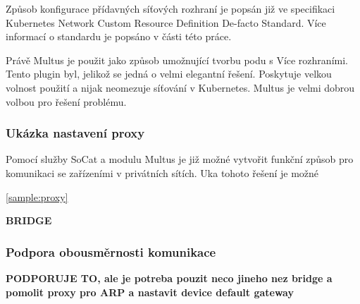 Způsob konfigurace přídavných síťových rozhraní je popsán již ve specifikaci Kubernetes Network Custom Resource Definition De-facto Standard. Více informací o standardu je popsáno v \label{sec:kncrdds} části této práce.

Právě Multus je použit jako způsob umožnující tvorbu podu s Více rozhraními. Tento plugin byl, jelikož se jedná o velmi elegantní řešení. Poskytuje velkou volnost použití a nijak neomezuje síťování v Kubernetes. Multus je velmi dobrou volbou pro řešení problému.




\subsubsection*{Ukázka nastavení proxy}
Pomocí služby SoCat a modulu Multus je již možné vytvořit funkční způsob pro komunikaci se zařízeními v privátních sítích. Uka tohoto řešení je možné 


\ref{sample:proxy}

\textbf{BRIDGE}

\subsubsection*{Podpora obousměrnosti komunikace}
\textbf{PODPORUJE TO, ale je potreba pouzit neco jineho nez bridge a pomolit proxy pro ARP a nastavit device default gateway}


